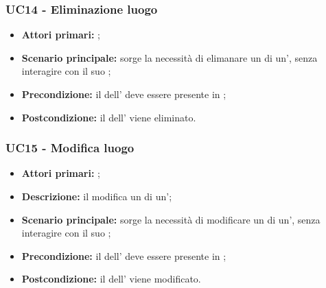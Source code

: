 \documentclass[casi-duso]{subfiles}
\begin{document}
\subsubsection{UC14 - Eliminazione luogo}
\label{subsub:UC14}
\begin{itemize}
  \item \textbf{Attori primari:} ;
  \item \textbf{Scenario principale:} sorge la necessità di elimanare un  di un', senza interagire con il suo ;
  \item \textbf{Precondizione:} il  dell' deve essere presente in ;
  \item \textbf{Postcondizione:} il  dell' viene eliminato.

\end{itemize}

\subsubsection{UC15 - Modifica luogo}
\label{subsub:UC15}
\begin{itemize}
  \item \textbf{Attori primari:} ;
  \item \textbf{Descrizione:} il  modifica un  di un';
  \item \textbf{Scenario principale:} sorge la necessità di modificare un  di un', senza interagire con il suo ;
  \item \textbf{Precondizione:} il  dell' deve essere presente in ;
  \item \textbf{Postcondizione:} il  dell' viene modificato.

\end{itemize}
\end{document}
